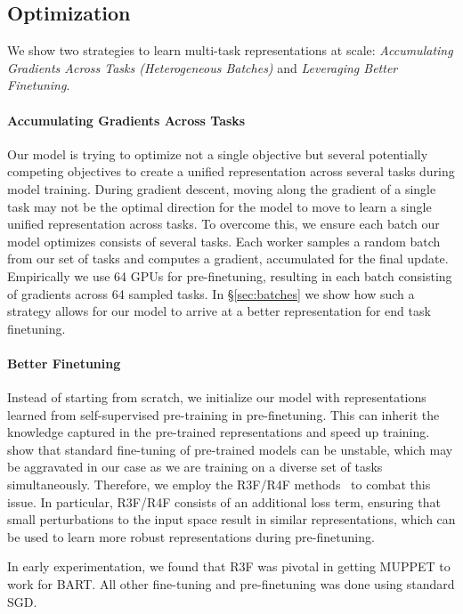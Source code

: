 \documentclass[11pt,a4paper]{article}
\begin{document}
\subsection{Optimization}

We show two strategies to learn multi-task representations at scale: \textit{Accumulating Gradients Across Tasks (Heterogeneous Batches)} and \textit{Leveraging Better Finetuning}.

\paragraph{Accumulating Gradients Across Tasks} Our model is trying to optimize not a single objective but several potentially competing objectives to create a unified representation across several tasks during model training. During gradient descent, moving along the gradient of a single task may not be the optimal direction for the model to move to learn a single unified representation across tasks. To overcome this, we ensure each batch our model optimizes consists of several tasks. Each worker samples a random batch from our set of tasks and computes a gradient, accumulated for the final update. Empirically we use 64 GPUs for pre-finetuning, resulting in each batch consisting of gradients across 64 sampled tasks. In \S\ref{sec:batches} we show how such a strategy allows for our model to arrive at a better representation for end task finetuning.

\paragraph{Better Finetuning} 
Instead of starting from scratch, we initialize our model with representations learned from self-supervised pre-training in pre-finetuning. This can inherit the knowledge captured in the pre-trained representations and speed up training. \citet{stability_bert} show that standard fine-tuning of pre-trained models can be unstable, which may be aggravated in our case as we are training on a diverse set of tasks simultaneously. Therefore, we employ the R3F/R4F methods~\cite{RXF} to combat this issue. In particular, R3F/R4F consists of an additional loss term, ensuring that small perturbations to the input space result in similar representations, which can be used to learn more robust representations during pre-finetuning.

In early experimentation, we found that R3F was pivotal in getting MUPPET to work for BART. All other fine-tuning and pre-finetuning was done using standard SGD.
\end{document}
